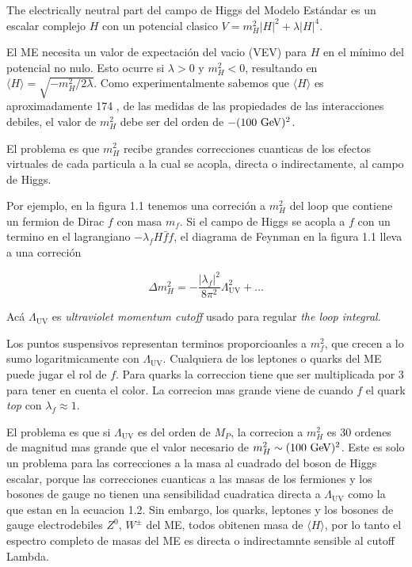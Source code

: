 The electrically neutral part del campo de Higgs del Modelo Est\'andar es un escalar complejo $H$ con
un potencial clasico $V=m_H^2 |H|^2 + \lambda|H|^4$.

El ME necesita un valor de expectaci\'on del vacio (VEV) para $H$ en el m\'inimo del potencial no nulo.
Esto ocurre si $\lambda>0$ y $m_H^2<0$, resultando en $\langle H \rangle = \sqrt{-m_H^2/2\lambda}$.
Como experimentalmente sabemos que $\langle H \rangle$ es aproximadamente 174 \gev, de las medidas
de las propiedades de las interacciones debiles, el valor de  $m_H^2$ debe ser del orden de $-(100 \gev)^2$.

El problema es que $m_H^2$ recibe grandes correcciones cuanticas de los efectos virtuales de cada
particula a la cual se acopla, directa o indirectamente, al campo de Higgs.

Por ejemplo, en la figura 1.1 tenemos una correci\'on a $m_H^2$ del loop que contiene un fermion de
Dirac $f$ con masa $m_f$. Si el campo de Higgs se acopla a $f$ con un termino en el lagrangiano
$-\lambda_f H \bar{f}f$, el diagrama de Feynman en la figura 1.1 lleva a una correci\'on

\begin{equation}
  \Delta m_H^2 = -\frac{|\lambda_f|^2}{8\pi^2} \Lambda^2_\text{UV} + \ldots
\end{equation}

Ac\'a  $\Lambda_\text{UV}$ es \emph{ultraviolet momentum cutoff} usado para regular \emph{the loop integral}.

Los puntos suspensivos representan terminos proporcioanles a $m_f^2$, que crecen a lo sumo logaritmicamente con
$\Lambda_\text{UV}$. Cualquiera de los leptones o quarks del ME puede jugar el rol de $f$. Para quarks la correccion
tiene que ser multiplicada por 3 para tener en cuenta el color.
La correcion mas grande viene de cuando $f$ el quark \emph{top} con $\lambda_f \approx 1$.

El problema es que si $\Lambda_\text{UV}$ es del orden de $M_P$, la correcion a $m_H^2$ es
30 ordenes de magnitud mas grande que el valor necesario de $m_H^2 \sim (100 \gev)^2$.
Este es solo un problema para las correcciones a la masa al cuadrado del boson de Higgs escalar, porque
las correcciones cuanticas a las masas de los fermiones y los bosones de gauge no tienen una sensibilidad
cuadratica directa a $\Lambda_\text{UV}$ como la que estan en la ecuacion 1.2. Sin embargo, los quarks, leptones
y los bosones de gauge electrodebiles $Z^0$, $W^{\pm}$ del ME, todos obitenen masa de $\langle H \rangle$, por lo
tanto el espectro completo de masas del ME es directa o indirectamnte sensible al cutoff Lambda.

